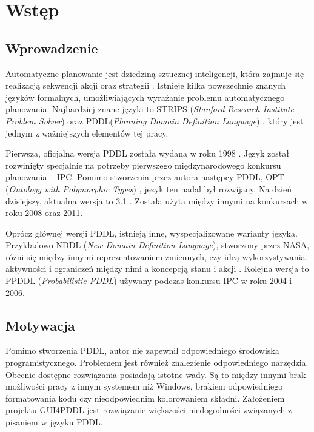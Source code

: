 \chapter{Wstęp}
\section{Wprowadzenie}
	Automatyczne planowanie jest dziedziną sztucznej inteligencji, która zajmuje się realizacją sekwencji akcji oraz strategii . Istnieje kilka powszechnie znanych języków formalnych, umożliwiających wyrażanie problemu automatycznego planowania. Najbardziej znane języki to STRIPS (\textit{Stanford Research Institute Problem Solver})  oraz PDDL(\textit{Planning Domain Definition Language}) , który jest jednym z ważniejszych elementów tej pracy.
	
	Pierwsza, oficjalna wersja PDDL została wydana w roku 1998 .  Język został rozwinięty specjalnie na potrzeby pierwszego międzynarodowego konkursu planowania – IPC. Pomimo stworzenia przez autora następcy PDDL, OPT (\textit{Ontology with Polymorphic Types}) , język ten nadal był rozwijany. Na dzień dzisiejszy, aktualna wersja to 3.1 . Została użyta między innymi na konkursach w roku 2008 oraz 2011.

	Oprócz głównej wersji PDDL, istnieją  inne, wyspecjalizowane warianty języka. Przykładowo  NDDL (\textit{New Domain Definition Language}), stworzony przez NASA, różni się między innymi reprezentowaniem  zmiennych, czy ideą wykorzystywania aktywności i ograniczeń między nimi a koncepcją stanu i akcji . Kolejna wersja to PPDDL (\textit{Probabilistic PDDL})  używany podczas konkursu IPC w roku 2004 i 2006.


\section{Motywacja}
Pomimo stworzenia PDDL, autor nie zapewnił odpowiedniego środowiska programistycznego. Problemem jest również znalezienie odpowiedniego narzędzia. Obecnie dostępne rozwiązania posiadają istotne wady. Są to między innymi brak możliwości pracy z innym systemem  niż Windows, brakiem odpowiedniego formatowania kodu czy nieodpowiednim kolorowaniem składni. Założeniem projektu GUI4PDDL jest rozwiązanie większości niedogodności związanych z pisaniem w języku PDDL.
